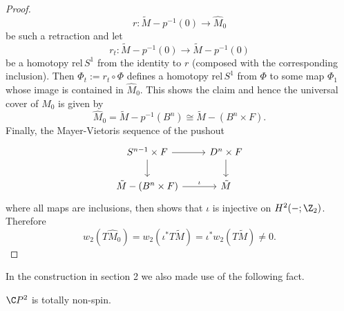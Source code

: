 \begin{proof}
    \[
    r \colon \tilde{M} - p^{-1}(0) \to \hat{M}_0
    \]
    be such a retraction and let 
    \[
    r_t \colon \tilde{M} - p^{-1}(0) \to \tilde{M} - p^{-1}(0)
    \]
    be a homotopy rel$\,S^1$ from the identity to $r$ (composed with the corresponding inclusion). Then $\Phi_t := r_t \circ \Phi$ defines a homotopy rel$\,S^1$ from $\Phi$ to some map $\Phi_1$ whose image is contained in $\hat{M}_0$. 
    This shows the claim and hence the universal cover of $M_0$ is given by 
    \[
    \hat{M}_0 = \tilde{M} - p^{-1}(B^n) \cong \tilde{M} - (B^n \times F).
    \]
    Finally, the Mayer-Vietoris sequence of the pushout 
    \[\begin{tikzcd}
	{S^{n-1} \times F} & {D^n \times F} \\
	{\tilde{M} - (B^n \times F)} & {\tilde{M}}
	\arrow[from=1-1, to=1-2]
	\arrow[from=1-1, to=2-1]
	\arrow[from=1-2, to=2-2]
	\arrow["\iota", from=2-1, to=2-2]
    \end{tikzcd}\]
    where all maps are inclusions, then shows that $\iota$ is injective on $H^2(-;\Z_2)$. Therefore
    \[
    w_2(T\hat{M}_0) = w_2(\iota^\ast T\tilde{M}) = \iota^\ast w_2(T\tilde{M}) \neq 0.
    \]
\end{proof}

In the construction in section 2 we also made use of the following fact.

\begin{lemma} \label{lem:cp2_not_spin}
    $\C P^2$ is totally non-spin.
\end{lemma}